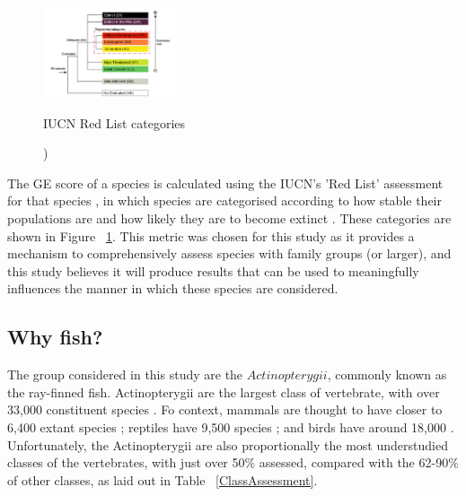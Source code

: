 \documentclass[11pt]{article}
\begin{document}
\begin{figure}
	
	\includegraphics[width=0.35\textwidth]{Images/RedListCategories.png}
	\caption{IUCN Red List categories}
	\caption{ \autocite{IUCN2000}})
	\label{IUCNcategories}
	
\end{figure}

The GE score of a species is calculated using the IUCN's 'Red 
List' assessment for that species \autocite{Isaac2007}, in which species are 
categorised according to how stable their populations are and how likely they 
are to become extinct \autocite{IUCN2000}. These categories are shown in Figure 
~\ref{IUCNcategories}. This metric was chosen for this 
study as it provides a mechanism to comprehensively assess species with family 
groups (or larger), and this study believes it will produce results that can be 
used to meaningfully influences the manner in which these species are 
considered. 

\subsection{Why fish?}

The group considered in this study are the \(Actinopterygii\), commonly 
known as the ray-finned fish. Actinopterygii are the largest class of 
vertebrate, with over 33,000 constituent species \autocite{Fishbase}. Fo 
context, mammals are thought to have closer to 6,400 extant species 
\autocite{Mammal2020}; reptiles have 9,500 species 
\autocite{Pincheira-Donoso2013}
; and birds have around 18,000 \autocite{Barrowclough2016}. Unfortunately, the 
Actinopterygii are also proportionally 
the most understudied classes of the vertebrates, with just over 50\% assessed, 
compared with the 62-90\% of other classes, as laid out in 
Table ~\ref{ClassAssessment}. \\
\end{document}
